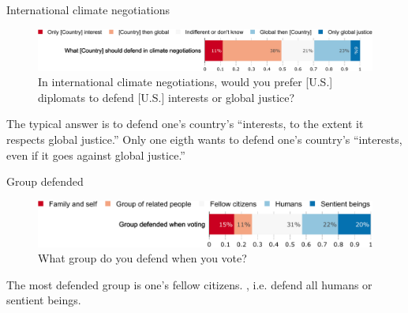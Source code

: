 \documentclass[aspectratio=169,xcolor=dvipsnames, 11pt,mathserif]{beamer}
\begin{document}
\begin{frame}{International climate negotiations \hyperlink{donation}{}\label{negotiation}}
    \begin{figure}
        \centering 
        \caption{In international climate negotiations, would you prefer [U.S.] diplomats to defend [U.S.] interests or global justice?
        }
        \vspace{-.2cm}
        \includegraphics[width=\textwidth]{../figures/all/negotiation.pdf} 
    \end{figure}
	\bbvs \ip The typical answer is to defend one's country's ``interests, to the extent it respects global justice.''
    \ip Only one eigth wants to defend one's country's ``interests, even if it goes against global justice.''
    \ee
\end{frame}

\begin{frame}{Group defended \hyperlink{donation}{}\label{group_defended}}
    \begin{figure}
        \centering 
        \caption{What group do you defend when you vote?
        }
        \vspace{-.2cm}
        \includegraphics[width=\textwidth]{../figures/all/group_defended_agg2.pdf} 
    \end{figure}
	\bbvs \ip The most defended group is one's fellow citizens.
    \ip {}, i.e. defend all humans or sentient beings.
    \ee
\end{frame}
\end{document}
